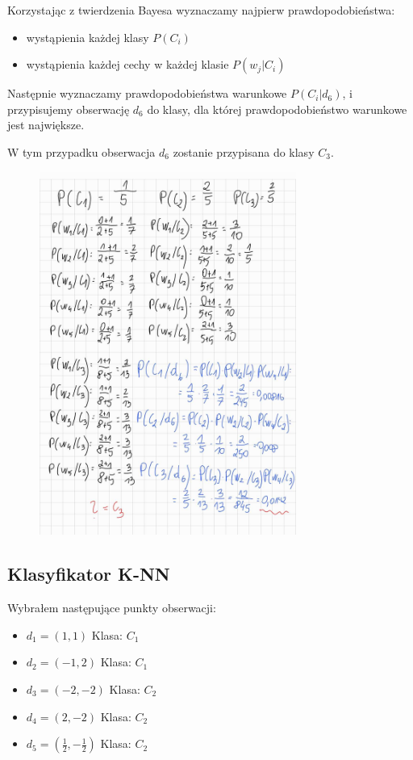 \documentclass{article}
\begin{document}
\newpage

Korzystając z twierdzenia Bayesa wyznaczamy najpierw
prawdopodobieństwa: 
\begin{itemize}
    \item wystąpienia każdej klasy $P(C_i)$
    \item wystąpienia każdej cechy w każdej klasie $P(w_j|C_i)$
\end{itemize}

Następnie wyznaczamy prawdopodobieństwa warunkowe $P(C_i|d_6)$,
i przypisujemy obserwację $d_6$ do klasy, dla której
prawdopodobieństwo warunkowe jest największe.

W tym przypadku obserwacja $d_6$ zostanie przypisana do klasy $C_3$.

\begin{figure}[H]
    \centering
    \includegraphics[width=0.75\textwidth]{bayes2.jpg}
\end{figure}

\newpage

\subsection{Klasyfikator K-NN}

Wybrałem następujące punkty obserwacji:
\begin{itemize}
    \item $d_1 = (1, 1)$ Klasa: $C_1$
    \item $d_2 = (-1, 2)$ Klasa: $C_1$
    \item $d_3 = (-2, -2)$ Klasa: $C_2$
    \item $d_4 = (2, -2)$ Klasa: $C_2$
    \item $d_5 = (\frac{1}{2}, -\frac{1}{2})$ Klasa: $C_2$
\end{itemize}
\end{document}
